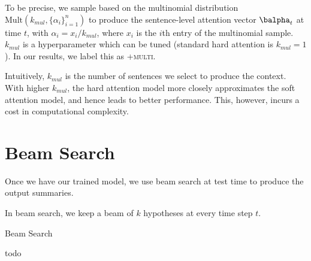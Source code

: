 \documentclass[12pt]{report}
\begin{document}
To be precise, we sample based on the multinomial distribution $\mathrm{Mult}(k_{mul}, \{\alpha_i\}_{i=1}^n)$ to produce the sentence-level attention vector $\balpha_t$ at time $t$, with $\alpha_i = x_i / k_{mul}$, where $x_i$ is the $i$th entry of the multinomial sample. $k_{mul}$ is a hyperparameter which can be tuned (standard hard attention is $k_{mul} = 1$). In our results, we label this as \textsc{+multi}.

Intuitively, $k_{mul}$ is the number of sentences we select to produce the context. With higher $k_{mul}$, the hard attention model more closely approximates the soft attention model, and hence leads to better performance. This, however, incurs a cost in computational complexity.

\section{Beam Search}

Once we have our trained model, we use beam search at test time to produce the output summaries.

In beam search, we keep a beam of $k$ hypotheses at every time step $t$. 

\begin{algorithm}[b]
\caption{Beam Search}
\label{alg:beam_search}
\begin{algorithmic}
\State todo
\end{algorithmic}
\end{algorithm}






%
%
\end{document}

